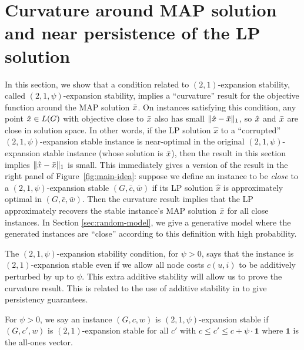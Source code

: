 \section{Curvature around MAP solution and near persistence of the LP solution}\label{sec:stable-curvature}
In this section, we show that a condition related to $(2,1)$-expansion stability, called $(2,1,\psi)$-expansion stability, implies a ``curvature'' result for the objective function around the MAP solution $\bar{x}$. On instances satisfying this condition, any point $\hat{x}\in L(G)$ with objective close to $\bar{x}$ also has small $\lVert \hat{x}-\bar{x} \rVert_1$, so $\hat{x}$ and $\bar{x}$ are close in solution space. In other words, if the LP solution $\hat{x}$ to a ``corrupted'' $(2,1,\psi)$-expansion stable instance is near-optimal in the original $(2,1,\psi)$-expansion stable instance (whose solution is $\bar{x}$), then the result in this section implies $\lVert \hat{x}-\bar{x} \rVert_1$ is small. This immediately gives a version of the result in the right panel of Figure~\ref{fig:main-idea}: suppose we define an instance to be \emph{close} to a $(2,1,\psi)$-expansion stable $(G,\bar{c},\bar{w})$ if its LP solution $\hat{x}$ is approximately optimal in $(G,\bar{c},\bar{w})$. Then the curvature result implies that the LP approximately recovers the stable instance's MAP solution $\bar{x}$ for all close instances. In Section \ref{sec:random-model}, we give a generative model where the generated instances are ``close'' according to this definition with high probability.


The $(2,1,\psi)$-expansion stability condition, for $\psi > 0$, says that the instance is $(2,1)$-expansion stable even if we allow all node costs $c(u,i)$ to be additively perturbed by up to $\psi$. This extra additive stability will allow us to prove the curvature result.
This is related to the use of additive stability in \citet{LanSonVij19} to give persistency guarantees.
\begin{definition} For $\psi > 0$, we say an instance $(G,c,w)$ is $(2,1,\psi)$-expansion stable if $(G,c',w)$ is $(2,1)$-expansion stable for all $c'$ with $c \le c' \le c+ \psi \cdot \mathbf{1}$ where $\mathbf{1}$ is the all-ones vector.
\end{definition}

